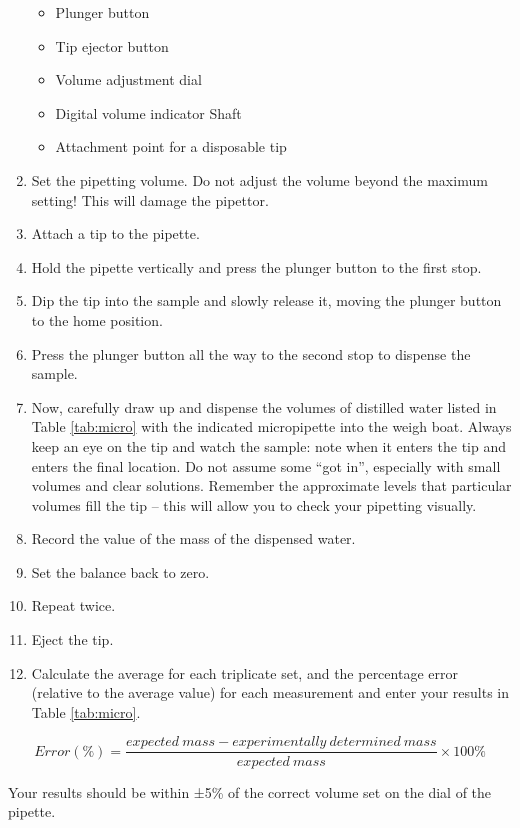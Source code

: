 \documentclass[]{book}
\providecommand{\tightlist}{%
  \setlength{\itemsep}{0pt}\setlength{\parskip}{0pt}}
\theoremstyle{definition}
\theoremstyle{definition}
\theoremstyle{definition}
\theoremstyle{remark}
\begin{document}
\begin{enumerate}
  \begin{itemize}
  \tightlist
  \item
    Plunger button
  \item
    Tip ejector button
  \item
    Volume adjustment dial
  \item
    Digital volume indicator Shaft
  \item
    Attachment point for a disposable tip
  \end{itemize}
\item
  Set the pipetting volume. Do not adjust the volume beyond the maximum
  setting! This will damage the pipettor.
\item
  Attach a tip to the pipette.
\item
  Hold the pipette vertically and press the plunger button to the first
  stop.
\item
  Dip the tip into the sample and slowly release it, moving the plunger
  button to the home position.
\item
  Press the plunger button all the way to the second stop to dispense
  the sample.
\item
  Now, carefully draw up and dispense the volumes of distilled water
  listed in Table \ref{tab:micro} with the indicated micropipette into
  the weigh boat. Always keep an eye on the tip and watch the sample:
  note when it enters the tip and enters the final location. Do not
  assume some ``got in'', especially with small volumes and clear
  solutions. Remember the approximate levels that particular volumes
  fill the tip -- this will allow you to check your pipetting visually.
\item
  Record the value of the mass of the dispensed water.
\item
  Set the balance back to zero.
\item
  Repeat twice.
\item
  Eject the tip.
\item
  Calculate the average for each triplicate set, and the percentage
  error (relative to the average value) for each measurement and enter
  your results in Table \ref{tab:micro}.
\end{enumerate}

\[ Error (\%) = \frac{expected\ mass - experimentally\ determined\ mass}{expected\ mass} \times 100\% \]

Your results should be within ±5\% of the correct volume set on the dial
of the pipette.
\end{document}

